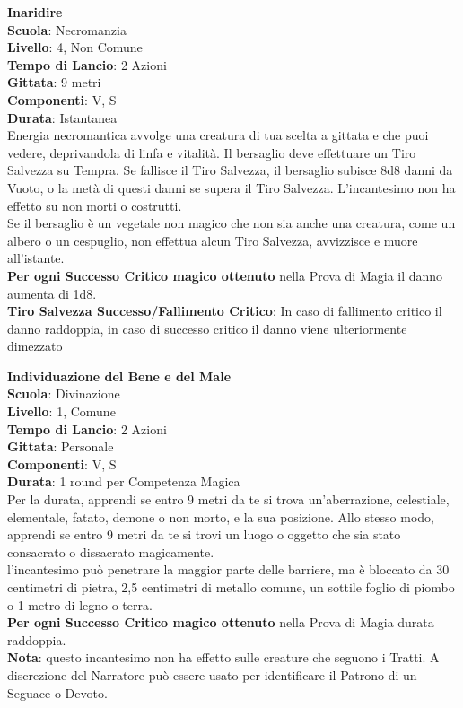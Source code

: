 \begin{multicols}{2}
\medskip\textbf{Inaridire}\\
\textbf{Scuola}: Necromanzia\\
\textbf{Livello}: 4, Non Comune\\
\textbf{Tempo di Lancio}: 2 Azioni\\
\textbf{Gittata}: 9 metri\\
\textbf{Componenti}: V, S\\
\textbf{Durata}: Istantanea\\
Energia necromantica avvolge una creatura di tua scelta a gittata e che puoi vedere, deprivandola di linfa e vitalità. Il bersaglio deve effettuare un Tiro Salvezza su Tempra. Se fallisce il Tiro Salvezza, il bersaglio subisce 8d8 danni da Vuoto, o la metà di questi danni se supera il Tiro Salvezza. L'incantesimo non ha effetto su non morti o costrutti.\\
Se il bersaglio è un vegetale non magico che non sia anche una creatura, come un albero o un cespuglio, non effettua alcun Tiro Salvezza, avvizzisce e muore all'istante.\\
\textbf{Per ogni Successo Critico magico ottenuto} nella Prova di Magia il danno aumenta di 1d8.\\
\textbf{Tiro Salvezza Successo/Fallimento Critico}: In caso di fallimento critico il danno raddoppia, in caso di successo critico il danno viene ulteriormente dimezzato

\medskip\textbf{Individuazione del Bene e del Male}\\
\textbf{Scuola}: Divinazione\\
\textbf{Livello}: 1, Comune\\
\textbf{Tempo di Lancio}: 2 Azioni\\
\textbf{Gittata}: Personale\\
\textbf{Componenti}: V, S\\
\textbf{Durata}: 1 round per Competenza Magica\\
Per la durata, apprendi se entro 9 metri da te si trova un'aberrazione, celestiale, elementale, fatato, demone o non morto, e la sua posizione. Allo stesso modo, apprendi se entro 9 metri da te si trovi un luogo o oggetto che sia stato consacrato o dissacrato magicamente.\\
l'incantesimo può penetrare la maggior parte delle barriere, ma è bloccato da 30 centimetri di pietra, 2,5 centimetri di metallo comune, un sottile foglio di piombo o 1 metro di legno o terra.\\
\textbf{Per ogni Successo Critico magico ottenuto} nella Prova di Magia durata raddoppia.\\
\textbf{Nota}: questo incantesimo non ha effetto sulle creature che seguono i Tratti. A discrezione del Narratore può essere usato per identificare il Patrono di un Seguace o Devoto.


\end{multicols}
